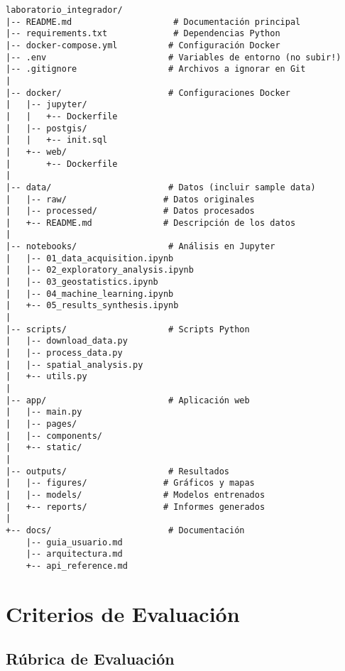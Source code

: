 \documentclass[12pt,a4paper]{article}
\begin{document}
\begin{verbatim}
laboratorio_integrador/
|-- README.md                    # Documentación principal
|-- requirements.txt             # Dependencias Python
|-- docker-compose.yml          # Configuración Docker
|-- .env                        # Variables de entorno (no subir!)
|-- .gitignore                  # Archivos a ignorar en Git
|
|-- docker/                     # Configuraciones Docker
|   |-- jupyter/
|   |   +-- Dockerfile
|   |-- postgis/
|   |   +-- init.sql
|   +-- web/
|       +-- Dockerfile
|
|-- data/                       # Datos (incluir sample data)
|   |-- raw/                   # Datos originales
|   |-- processed/             # Datos procesados
|   +-- README.md              # Descripción de los datos
|
|-- notebooks/                  # Análisis en Jupyter
|   |-- 01_data_acquisition.ipynb
|   |-- 02_exploratory_analysis.ipynb
|   |-- 03_geostatistics.ipynb
|   |-- 04_machine_learning.ipynb
|   +-- 05_results_synthesis.ipynb
|
|-- scripts/                    # Scripts Python
|   |-- download_data.py
|   |-- process_data.py
|   |-- spatial_analysis.py
|   +-- utils.py
|
|-- app/                        # Aplicación web
|   |-- main.py
|   |-- pages/
|   |-- components/
|   +-- static/
|
|-- outputs/                    # Resultados
|   |-- figures/               # Gráficos y mapas
|   |-- models/                # Modelos entrenados
|   +-- reports/               # Informes generados
|
+-- docs/                       # Documentación
    |-- guia_usuario.md
    |-- arquitectura.md
    +-- api_reference.md
\end{verbatim}

\section{Criterios de Evaluación}

\subsection{Rúbrica de Evaluación}
\end{document}
